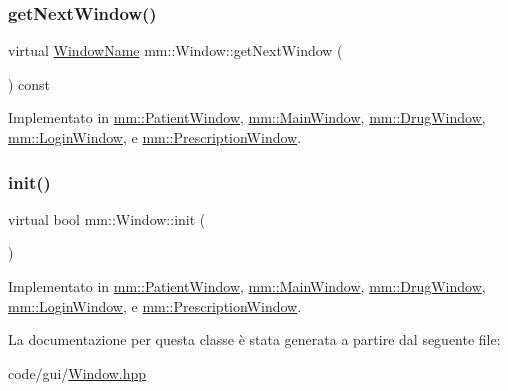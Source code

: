 \mbox{\label{classmm_1_1_window_a0cd7b4b0feb9505c44503547a161fcd8}} 
\subsubsection{\texorpdfstring{get\+Next\+Window()}{getNextWindow()}}
{\footnotesize\ttfamily virtual \mbox{\hyperlink{namespacemm_a4e9d92e04f65dbf2fc1963947da0d93c}{Window\+Name}} mm\+::\+Window\+::get\+Next\+Window (\begin{DoxyParamCaption}{ }\end{DoxyParamCaption}) const\hspace{0.3cm}{\ttfamily [pure virtual]}}



Implementato in \mbox{\hyperlink{classmm_1_1_patient_window_ae22b9bce4c7ccdbcc45feb080088a558}{mm\+::\+Patient\+Window}}, \mbox{\hyperlink{classmm_1_1_main_window_aa1511ad7bed8d47cd35415d0a3a1161e}{mm\+::\+Main\+Window}}, \mbox{\hyperlink{classmm_1_1_drug_window_a571966bdd4a2ecf069cdca69c73726b2}{mm\+::\+Drug\+Window}}, \mbox{\hyperlink{classmm_1_1_login_window_a399eb7e1a310016ff83b7aa6a9d69722}{mm\+::\+Login\+Window}}, e \mbox{\hyperlink{classmm_1_1_prescription_window_aec9558aea3a0fb15e3148ebf4c9e8d40}{mm\+::\+Prescription\+Window}}.

\mbox{\label{classmm_1_1_window_aba03fbf4761b2f106352baecf5996e10}} 
\subsubsection{\texorpdfstring{init()}{init()}}
{\footnotesize\ttfamily virtual bool mm\+::\+Window\+::init (\begin{DoxyParamCaption}{ }\end{DoxyParamCaption})\hspace{0.3cm}{\ttfamily [pure virtual]}}



Implementato in \mbox{\hyperlink{classmm_1_1_patient_window_a0ad27245769b095559858eeecdbb7089}{mm\+::\+Patient\+Window}}, \mbox{\hyperlink{classmm_1_1_main_window_a1094273a8ac991a50e4612efa8174fdd}{mm\+::\+Main\+Window}}, \mbox{\hyperlink{classmm_1_1_drug_window_a54f331f1c516ce9113a9dade43948a16}{mm\+::\+Drug\+Window}}, \mbox{\hyperlink{classmm_1_1_login_window_a4040d7c1f85fc76e1f60ef13f92bef1c}{mm\+::\+Login\+Window}}, e \mbox{\hyperlink{classmm_1_1_prescription_window_a4764fe59cd6aeaa46c7fd8820dd4102b}{mm\+::\+Prescription\+Window}}.



La documentazione per questa classe è stata generata a partire dal seguente file\+:\begin{DoxyCompactItemize}
\item 
code/gui/\mbox{\hyperlink{_window_8hpp}{Window.\+hpp}}\end{DoxyCompactItemize}
